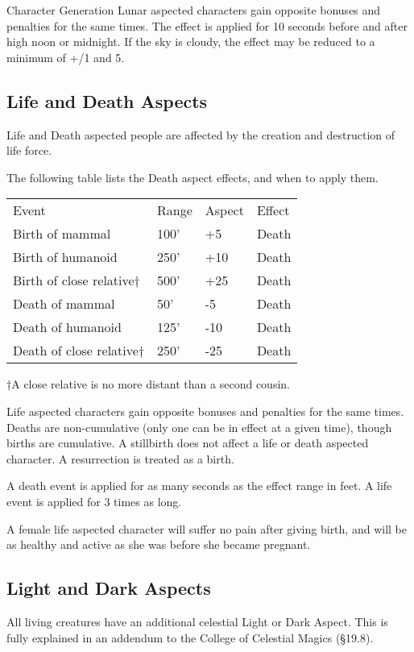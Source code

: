 \begin{Chapter}{Character Generation}
Lunar aspected characters gain opposite bonuses and penalties for the
same times.  The effect is applied for 10 seconds before and after
high noon or midnight. If the sky is cloudy, the effect may be reduced
to a minimum of +/1 and 5.

\subsection{Life and Death Aspects}

Life and Death aspected people are affected by the creation and
destruction of life force.

The following table lists the Death aspect effects, and when to apply
them.

\begin{tabularx}{\columnwidth}{Xlll}
Event				& Range		& Aspect	& Effect \\
Birth of mammal  		& 100’		& +5		& Death \\
Birth of humanoid  		& 250’		& +10		& Death \\
Birth of close relative†	& 500’		& +25		& Death \\
Death of mammal  		& 50’		& -5		& Death \\
Death of humanoid  		& 125’		& -10		& Death \\
Death of close relative†	& 250’		& -25		& Death \\
\end{tabularx}

†A close relative is no more distant than a second cousin.

Life aspected characters gain opposite bonuses and penalties for the
same times.  Deaths are non-cumulative (only one can be in effect at a
given time), though births are cumulative.  A stillbirth does not
affect a life or death aspected character. A resurrection is treated
as a birth.

A death event is applied for as many seconds as the effect range in
feet.  A life event is applied for 3 times as long.

A female life aspected character will suffer no pain after giving
birth, and will be as healthy and active as she was before she became
pregnant.

\subsection{Light and Dark Aspects}

All living creatures have an additional celestial Light or Dark
Aspect.  This is fully explained in an addendum to the College of
Celestial Magics (§19.8).



\end{Chapter}
